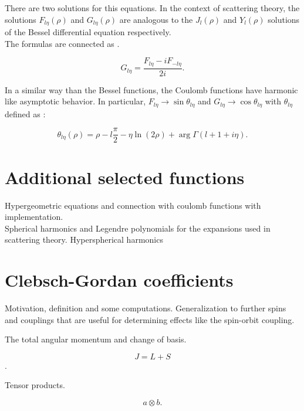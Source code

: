 \documentclass[openany]{book}
\begin{document}
There are two solutions for this equations. In the context of scattering theory, the solutions $F_{l\eta}(\rho)$ and $G_{l\eta}(\rho)$ are analogous to the  $J_l(\rho)$ and $Y_l(\rho)$ solutions of the Bessel differential equation respectively.  \\

The formulas are connected as \cite{gaspard_2018}.

\begin{equation}
	G_{l\eta} = \frac{F_{l\eta} - iF_{-l\eta} }{2i}.
\end{equation}

In a similar way than the Bessel functions, the Coulomb functions have harmonic like asymptotic behavior. In particular,  $F_{l\eta} \rightarrow \sin{\theta_{l\eta}}$ and $G_{l\eta} \rightarrow \cos{\theta_{l\eta}}$ with $\theta_{l\eta}$ defined as :

\begin{equation}
	\theta_{l\eta}(\rho) = \rho -  l\frac{\pi}{2}  - \eta\ln{(2\rho)} +  \arg\Gamma(l+ 1+i\eta).
\end{equation}

\section{Additional selected functions} \label{sec:additionalFunctions}

Hypergeometric equations and connection with coulomb functions with implementation. \\

Spherical harmonics and Legendre polynomials for the expansions used in scattering theory.  Hyperspherical harmonics\\

\section{Clebsch-Gordan coefficients} \label{sec:clebschGordan}

Motivation, definition and some computations. Generalization to further spins and couplings that are useful for determining effects like the spin-orbit coupling. 

The total angular momentum and change of basis.

\begin{equation}
	J = L + S
\end{equation}.

Tensor products.

\begin{equation}
	a \otimes b.
\end{equation}
\end{document}
